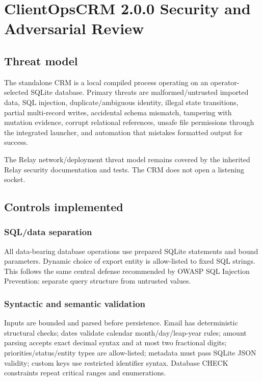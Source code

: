 \documentclass[
]{article}
\author{}
\date{}
\begin{document}
\section{ClientOpsCRM 2.0.0 Security and Adversarial
Review}\label{clientopscrm-200-security-and-adversarial-review}

\subsection{Threat model}\label{threat-model}

The standalone CRM is a local compiled process operating on an
operator-selected SQLite database. Primary threats are
malformed/untrusted imported data, SQL injection, duplicate/ambiguous
identity, illegal state transitions, partial multi-record writes,
accidental schema mismatch, tampering with mutation evidence, corrupt
relational references, unsafe file permissions through the integrated
launcher, and automation that mistakes formatted output for success.

The Relay network/deployment threat model remains covered by the
inherited Relay security documentation and tests. The CRM does not open
a listening socket.

\subsection{Controls implemented}\label{controls-implemented}

\subsubsection{SQL/data separation}\label{sqldata-separation}

All data-bearing database operations use prepared SQLite statements and
bound parameters. Dynamic choice of export entity is allow-listed to
fixed SQL strings. This follows the same central defense recommended by
OWASP SQL Injection Prevention: separate query structure from untrusted
values.

\subsubsection{Syntactic and semantic
validation}\label{syntactic-and-semantic-validation}

Inputs are bounded and parsed before persistence. Email has
deterministic structural checks; dates validate calendar
month/day/leap-year rules; amount parsing accepts exact decimal syntax
and at most two fractional digits; priorities/status/entity types are
allow-listed; metadata must pass SQLite JSON validity; custom keys use
restricted identifier syntax. Database CHECK constraints repeat critical
ranges and enumerations.
\end{document}
